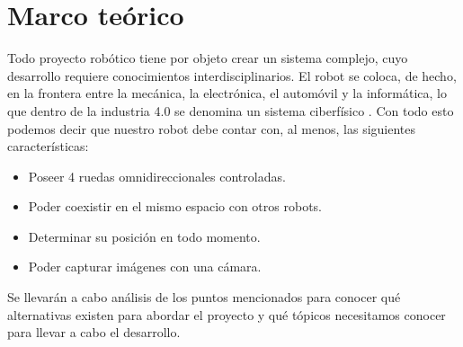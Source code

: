 
\chapter{Marco teórico}

Todo proyecto robótico tiene por objeto crear un sistema complejo, cuyo desarrollo requiere conocimientos interdisciplinarios. El robot se coloca, de hecho, en la frontera entre la mecánica, la electrónica, el automóvil y la informática, lo que dentro de la industria 4.0 se denomina un sistema ciberfísico \cite{lee2017introduction}. Con todo esto podemos decir que nuestro robot debe contar con, al menos, las siguientes características:

\begin{itemize}
    \item Poseer 4 ruedas omnidireccionales controladas.
    \item Poder coexistir en el mismo espacio con otros robots.
    \item Determinar su posición en todo momento.
    \item Poder capturar imágenes con una cámara.
\end{itemize}

Se llevarán a cabo análisis de los puntos mencionados para conocer qué alternativas existen para abordar el proyecto y qué tópicos necesitamos conocer para llevar a cabo el desarrollo.








